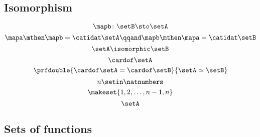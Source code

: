 {\begin{forslides}
    \subsection{Isomorphism}

    \begin{equation}
        \label{eq:slides_session2_148}
        \mapb \colon \setB \sto \setA
    \end{equation}
    \begin{equation}
        \label{eq:slides_session2_149}
        \mapa \mthen \mapb = \catidat\setA
        \qqand
        \mapb \mthen \mapa = \catidat\setB
    \end{equation}
    \begin{equation}
        \label{eq:slides_session2_150}
        \setA \isomorphic \setB
    \end{equation}
    \begin{equation}
        \label{eq:slides_session2_151}
        \cardof \setA
    \end{equation}
    \begin{equation}
        \label{eq:slides_session2_152}
        \prfdouble{
            \cardof \setA   = \cardof \setB
        }{
            \setA \simeq \setB
        }
    \end{equation}
    \begin{equation}
        \label{eq:slides_session2_153}
        n \setin \natnumbers
    \end{equation}
    \begin{equation}
        \label{eq:slides_session2_154}
        \makeset{1,2, \dots, n-1, n}
    \end{equation}
    \begin{equation}
        \label{eq:slides_session2_155}
        \setA
    \end{equation}

    \subsection{Sets of functions}


\end{forslides}}
